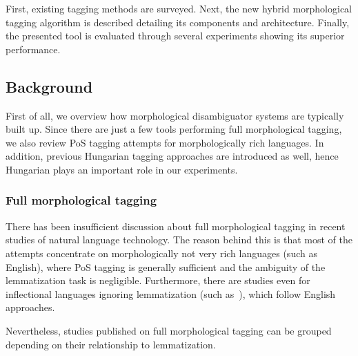 First, existing tagging methods are surveyed. 
Next, the new hybrid morphological tagging algorithm is described detailing its components and architecture. 
Finally, the presented tool is evaluated through several experiments showing its superior performance.

\subsection{Background}

First of all, we overview how morphological disambiguator systems are typically built up. 
Since there are just a few tools performing full morphological tagging, we also review PoS tagging attempts for morphologically rich languages. 
In addition, previous Hungarian tagging approaches are introduced as well, hence Hungarian plays an important role in our experiments.

\subsubsection{Full morphological tagging}

There has been insufficient discussion about full morphological tagging in recent studies of natural language technology. 
The reason behind this is that most of the attempts concentrate on morphologically not very rich languages (such as English), where PoS tagging is generally sufficient and the ambiguity of the lemmatization task is negligible. 
Furthermore, there are studies even for inflectional languages ignoring lemmatization (such as~\cite{Hajic1998a,Tufis1998,Silfverberg2011}), which follow English approaches. 

Nevertheless, studies published on full morphological tagging can be grouped depending on their relationship to lemmatization.

